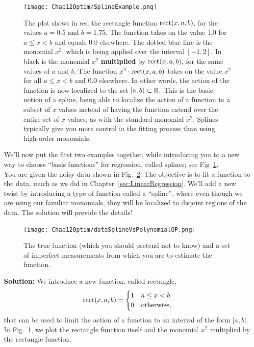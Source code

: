 \begin{figure}[H]%
\centering
\texttt{[image: Chap12Optim/SplineExample.png]}%
\caption[]{The plot shows in red the rectangle function ${\rm rect}(x, a, b)$, for the values $a=0.5$ and $b=1.75$. The function takes on the value $1.0$ for $a \le x < b$ and equals $0.0$ elsewhere. The dotted blue line is the monomial $x^2$, which is being applied over the interval $[-1, 2]$. In black is the monomial $x^2$ \textbf{multiplied} by ${\rm rect}(x, a, b)$, for the same values of $a$ and $b$. The function $ x^2 \cdot {\rm rect}(x, a, b)$ takes on the value $x^2$ for all $a \le x < b$ and $0.0$ elsewhere. In other words, the action of the function is now localized to the set $[a, b) \subset \mathbb R.$ This is the basic notion of a spline, being able to localize the action of a function to a subset of $x$ values instead of having the function extend over the entire set of $x$ values, as with the standard monomial $x^2$. Splines typically give you more control in the fitting process than using high-order monomials. 
}    
\label{fig:SplineExamplePlot}
\end{figure}


\vspace*{0.5cm}

\begin{example}
\label{ex:SplineRegressionQP}
We'll now put the first two examples together, while introducing you to a new way to choose ``basis functions'' for regression, called splines; see Fig~\ref{fig:SplineExamplePlot}. \\

You are given the noisy data shown in Fig.~\ref{fig:datSplineVsPolynomialQP}. The objective is to fit a function to the data, much as we did in Chapter~\ref{sec:LinearRegression}. We'll add a new twist by introducing a type of function called a ``spline'', where even though we are using our familiar monomials, they will be localized to disjoint regions of the data. The solution will provide the details!

\begin{figure}[hbt]%
\centering
\texttt{[image: Chap12Optim/dataSplineVsPolynomialQP.png]}%
\caption[]{The true function (which you should pretend not to know) and a set of imperfect measurements from which you are to estimate the function.   
}    
\label{fig:datSplineVsPolynomialQP}
\end{figure}
\end{example}

\textbf{Solution:} We introduce a new function, called rectangle, 
$$ {\rm rect}(x, a, b) = \begin{cases}  1 & a \le x < b\\ 0 & \text{otherwise},\end{cases} $$
that can be used to limit the action of a function to an interval of the form $[a, b). $  In Fig.~\ref{fig:SplineExamplePlot}, we plot the rectangle function itself and the monomial $x^2$ multiplied by the rectangle function. \\

